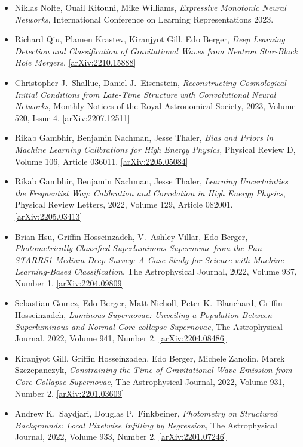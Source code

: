 \begin{itemize}
\item Niklas Nolte, Ouail Kitouni, Mike Williams, \textit{Expressive Monotonic Neural Networks}, International Conference on Learning Representations 2023. 
\item Richard Qiu, Plamen Krastev, Kiranjyot Gill, Edo Berger, \textit{Deep Learning Detection and Classification of Gravitational Waves from Neutron Star-Black Hole Mergers}, \href{https://arxiv.org/abs/2210.15888}{[arXiv:2210.15888]} 
\item Christopher J.\  Shallue, Daniel J.\  Eisenstein, \textit{Reconstructing Cosmological Initial Conditions from Late-Time Structure with Convolutional Neural Networks}, Monthly Notices of the Royal Astronomical Society, 2023, Volume 520, Issue 4. \href{https://arxiv.org/abs/2207.12511}{[arXiv:2207.12511]} 
\item Rikab Gambhir, Benjamin Nachman, Jesse Thaler, \textit{Bias and Priors in Machine Learning Calibrations for High Energy Physics}, Physical Review D, Volume 106, Article 036011. \href{https://arxiv.org/abs/2205.05084}{[arXiv:2205.05084]} 
\item Rikab Gambhir, Benjamin Nachman, Jesse Thaler, \textit{Learning Uncertainties the Frequentist Way: Calibration and Correlation in High Energy Physics}, Physical Review Letters, 2022, Volume 129, Article 082001. \href{https://arxiv.org/abs/2205.03413}{[arXiv:2205.03413]} 
\item Brian Hsu, Griffin Hosseinzadeh, V.\  Ashley Villar, Edo Berger, \textit{Photometrically-Classified Superluminous Supernovae from the Pan-STARRS1 Medium Deep Survey: A Case Study for Science with Machine Learning-Based Classification}, The Astrophysical Journal, 2022, Volume 937, Number 1. \href{https://arxiv.org/abs/2204.09809}{[arXiv:2204.09809]} 
\item Sebastian Gomez, Edo Berger, Matt Nicholl, Peter K.\  Blanchard, Griffin Hosseinzadeh, \textit{Luminous Supernovae: Unveiling a Population Between Superluminous and Normal Core-collapse Supernovae}, The Astrophysical Journal, 2022, Volume 941, Number 2. \href{https://arxiv.org/abs/2204.08486}{[arXiv:2204.08486]} 
\item Kiranjyot Gill, Griffin Hosseinzadeh, Edo Berger, Michele Zanolin, Marek Szczepanczyk, \textit{Constraining the Time of Gravitational Wave Emission from Core-Collapse Supernovae}, The Astrophysical Journal, 2022, Volume 931, Number 2. \href{https://arxiv.org/abs/2201.03609}{[arXiv:2201.03609]} 
\item Andrew K.\  Saydjari, Douglas P.\  Finkbeiner, \textit{Photometry on Structured Backgrounds: Local Pixelwise Infilling by Regression}, The Astrophysical Journal, 2022, Volume 933, Number 2. \href{https://arxiv.org/abs/2201.07246}{[arXiv:2201.07246]} 

\end{itemize}
